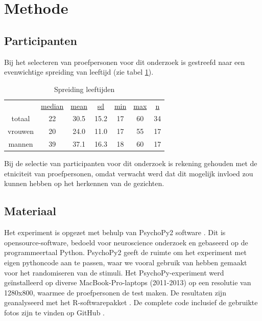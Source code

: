 \documentclass[a4paper,jou]{apa6}  %
\begin{document}
\section*{Methode}
\subsection{Participanten} 
Bij het selecteren van proefpersonen voor dit onderzoek is gestreefd naar een evenwichtige spreiding van leeftijd (zie tabel \ref{tab:leeftijden}).
\begin{table}
\caption{\label{tab:leeftijden}Spreiding leeftijden}
\begin{tabular}{c c c c c c c}
\hline
	& \underline{median} & \underline{mean} & \underline{sd} & \underline{min} & \underline{max} & \underline{n}\\
	totaal & 22 & 30.5 & 15.2 & 17 & 60 & 34\\
	vrouwen & 20 & 24.0 & 11.0 & 17 & 55 & 17\\
	mannen & 39 & 37.1 & 16.3 & 18 & 60 & 17\\
\hline
\end{tabular}
\end{table}
Bij de selectie van participanten voor dit onderzoek is rekening gehouden met de etniciteit van proefpersonen, omdat verwacht werd dat dit mogelijk invloed zou kunnen hebben op het herkennen van de gezichten\cite{sporer2001recognizing}.
\subsection{Materiaal}
Het experiment is opgezet met behulp van PsychoPy2 software \cite{peirce2007psychopy, Peirce2009generating}. Dit is opensource-software, bedoeld voor neuroscience onderzoek en gebaseerd op de programmeertaal Python. PsychoPy2 geeft de ruimte om het experiment met eigen pythoncode aan te passen, waar we vooral gebruik van hebben gemaakt voor het randomiseren van de stimuli. Het PsychoPy-experiment werd geïnstalleerd op diverse MacBook-Pro-laptops (2011-2013) op een resolutie van 1280x800, waarmee de proefpersonen de test maken. De resultaten zijn geanalyseerd met het R-softwarepakket \cite{Rsoftware}. De complete code inclusief de gebruikte fotos zijn te vinden op GitHub \cite{Grouls2017}.
\end{document}
